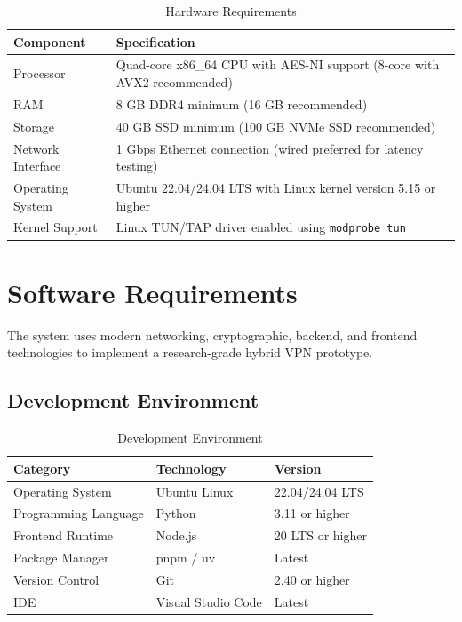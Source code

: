 \begin{table}[H]
\centering
\begin{tabular}{|l|p{8cm}|}
\hline
\textbf{Component} & \textbf{Specification} \\ \hline

Processor & Quad-core x86\_64 CPU with AES-NI support (8-core with AVX2 recommended) \\ \hline

RAM & 8 GB DDR4 minimum (16 GB recommended) \\ \hline

Storage & 40 GB SSD minimum (100 GB NVMe SSD recommended) \\ \hline

Network Interface & 1 Gbps Ethernet connection (wired preferred for latency testing) \\ \hline

Operating System & Ubuntu 22.04/24.04 LTS with Linux kernel version 5.15 or higher \\ \hline

Kernel Support & Linux TUN/TAP driver enabled using \texttt{modprobe tun} \\ \hline

\end{tabular}
\caption{Hardware Requirements}
\end{table}

\section{Software Requirements}

The system uses modern networking, cryptographic, backend, and frontend technologies to implement a research-grade hybrid VPN prototype.

\subsection{Development Environment}

\begin{table}[H]
\centering
\begin{tabular}{|l|l|l|}
\hline
\textbf{Category} & \textbf{Technology} & \textbf{Version} \\ \hline

Operating System & Ubuntu Linux & 22.04/24.04 LTS \\ \hline

Programming Language & Python & 3.11 or higher \\ \hline

Frontend Runtime & Node.js & 20 LTS or higher \\ \hline

Package Manager & pnpm / uv & Latest \\ \hline

Version Control & Git & 2.40 or higher \\ \hline

IDE & Visual Studio Code & Latest \\ \hline

\end{tabular}
\caption{Development Environment}
\end{table}

